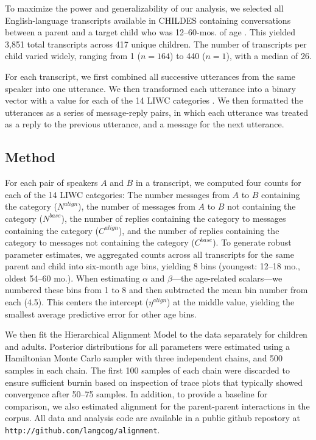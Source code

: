 \documentclass[10pt,letterpaper]{article}
\begin{document}
To maximize the power and generalizability of our analysis, we selected all English-language transcripts available in CHILDES containing conversations between a parent and a target child who was 12--60-mos. of age \cite{macwhinney2000}. This yielded  3,851 total transcripts across 417 unique children. The number of transcripts per child varied widely, ranging from 1 ($n = 164$) to 440 ($n = 1$), with a median of 26.

For each transcript, we first combined all successive utterances from the same speaker into one utterance. We then transformed each utterance into a binary vector with a value for each of the 14 LIWC categories \cite{pennebaker2007}. We then formatted the utterances as a series of message-reply pairs, in which each utterance was treated as a reply to the previous utterance, and a message for the next utterance.

\subsection{Method}

For each pair of speakers $A$ and $B$ in a transcript, we computed four counts for each of the 14 LIWC categories: The number messages from $A$ to $B$ containing the category ($N^{align}$), the number of messages from $A$ to $B$ not containing the category ($N^{base}$), the number of replies containing the category to messages containing the category ($C^{align}$), and the number of replies containing the category to messages not containing the category ($C^{base}$). To generate robust parameter estimates, we aggregated counts across all transcripts for the same parent and child into six-month age bins, yielding 8 bins (youngest: 12--18 mo., oldest 54--60 mo.). When estimating $\alpha$ and $\beta$---the age-related scalars---we numbered these bins from 1 to 8 and then subtracted the mean bin number from each (4.5). This centers the intercept ($\eta^{align}$) at the middle value, yielding the smallest average predictive error for other age bins.

We then fit the Hierarchical Alignment Model to the data separately for children and adults. Posterior distributions for all parameters were estimated using a Hamiltonian Monte Carlo sampler \cite{carpenter2016} with three independent chains, and 500 samples in each chain. The first 100 samples of each chain were discarded to ensure sufficient burnin based on inspection of trace plots that typically showed convergence after 50--75 samples. In addition, to provide a baseline for comparison, we also estimated alignment for the parent-parent interactions in the corpus. All data and analysis code are available in a public github repostory at {\small\tt http://github.com/langcog/alignment}.
\end{document}
